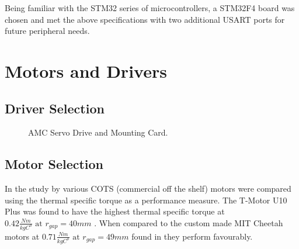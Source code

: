 Being familiar with the STM32 series of microcontrollers, a STM32F4 board was chosen and met the above specifications with two additional USART ports for future peripheral needs.

\section{Motors and Drivers}

\subsection{Driver Selection}

\begin{figure}
\centering
{}
\caption{AMC Servo Drive and Mounting Card.}
\label{fig:AMC Servo Drive and Mounting Card}
\end{figure}

\subsection{Motor Selection}

In the study by \cite{Kalouche2016} various COTS (commercial off the shelf) motors were compared using the thermal specific torque as a performance measure. The T-Motor U10 Plus was found to have the highest thermal specific torque at $0.42 \frac{Nm}{kgC^o } \text{ at } r_{gap} = 40 mm$ \cite{Kalouche2016}. When compared to the custom made MIT Cheetah motors at $0.71 \frac{Nm}{kgC^o } \text{ at } r_{gap} = 49 mm$ found in \cite{Wang2012} they perform favourably. 


